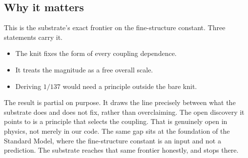\subsection{Why it matters}

This is the substrate's exact frontier on the fine-structure constant. Three statements carry it.

\begin{itemize}
\item The knit fixes the form of every coupling dependence.
\item It treats the magnitude as a free overall scale.
\item Deriving $1/137$ would need a principle outside the bare knit.
\end{itemize}

The result is partial on purpose. It draws the line precisely between what the substrate does and does not fix, rather than overclaiming. The open discovery it points to is a principle that selects the coupling. That is genuinely open in physics, not merely in our code. The same gap sits at the foundation of the Standard Model, where the fine-structure constant is an input and not a prediction. The substrate reaches that same frontier honestly, and stops there.
